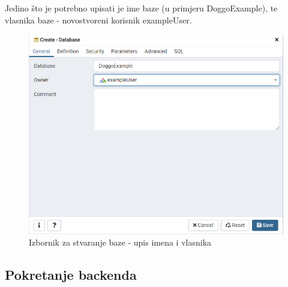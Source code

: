         			Jedino što je potrebno upisati je ime baze (u primjeru DoggoExample), te vlasnika baze - novostvoreni korisnik exampleUser.
        			
        			 \begin{figure}[H]
        				\includegraphics[scale=0.6]{slike/deploy_kreiranje_baze2.PNG} 
        				\centering
        				\caption{Izbornik za stvaranje baze - upis imena i vlasnika}
        				\label{fig:sustav-prvi-slucaj}
        			\end{figure}
        			
        			
                
                \subsection{Pokretanje backenda}
                
